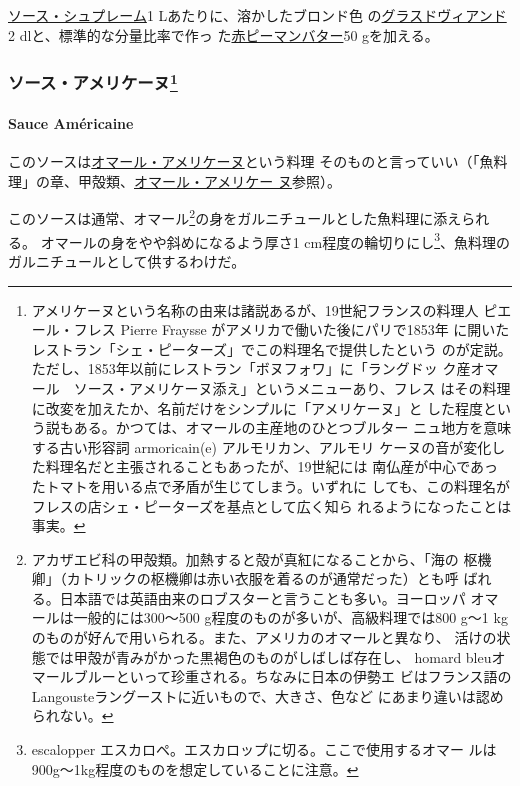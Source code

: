 \begin{recette}
\protect\hyperlink{sauce-supreme}{ソース・シュプレーム}1
Lあたりに、溶かしたブロンド色
の\protect\hyperlink{glace-de-viande}{グラスドヴィアンド}2
dlと、標準的な分量比率で作っ た\href{}{赤ピーマンバター}50 gを加える。

\maeaki

\hypertarget{ux30bdux30fcux30b9ux30a2ux30e1ux30eaux30b1ux30fcux30cc3}{%
\subsubsection[ソース・アメリケーヌ]{\texorpdfstring{ソース・アメリケーヌ\footnote{アメリケーヌという名称の由来は諸説あるが、19世紀フランスの料理人
  ピエール・フレス Pierre Fraysse がアメリカで働いた後にパリで1853年
  に開いたレストラン「シェ・ピーターズ」でこの料理名で提供したという
  のが定説。ただし、1853年以前にレストラン「ボヌフォワ」に「ラングドッ
  ク産オマール　ソース・アメリケーヌ添え」というメニューあり、フレス
  はその料理に改変を加えたか、名前だけをシンプルに「アメリケーヌ」と
  した程度という説もある。かつては、オマールの主産地のひとつブルター
  ニュ地方を意味する古い形容詞 armoricain(e) アルモリカン、アルモリ
  ケーヌの音が変化した料理名だと主張されることもあったが、19世紀には
  南仏産が中心であったトマトを用いる点で矛盾が生じてしまう。いずれに
  しても、この料理名がフレスの店シェ・ピーターズを基点として広く知ら
  れるようになったことは事実。}}{ソース・アメリケーヌ}}\label{ux30bdux30fcux30b9ux30a2ux30e1ux30eaux30b1ux30fcux30cc3}}

\hypertarget{sauce-americaine}{%
\paragraph{Sauce Américaine}\label{sauce-americaine}}


このソースは\protect\hyperlink{homard-a-l-americaine}{オマール・アメリケーヌ}という料理
そのものと言っていい（「魚料理」の章、甲殻類、\protect\hyperlink{homard-a-l-americaine}{オマール・アメリケー
ヌ}参照）。

このソースは通常、オマール\footnote{アカザエビ科の甲殻類。加熱すると殻が真紅になることから、「海の
  枢機卿」（カトリックの枢機卿は赤い衣服を着るのが通常だった）とも呼
  ばれる。日本語では英語由来のロブスターと言うことも多い。ヨーロッパ
  オマールは一般的には300〜500 g程度のものが多いが、高級料理では800 g〜1
  kgのものが好んで用いられる。また、アメリカのオマールと異なり、
  活けの状態では甲殻が青みがかった黒褐色のものがしばしば存在し、 homard
  bleuオマールブルーといって珍重される。ちなみに日本の伊勢エ
  ビはフランス語のLangousteラングーストに近いもので、大きさ、色など
  にあまり違いは認められない。}の身をガルニチュールとした魚料理に添えられる。
オマールの身をやや斜めになるよう厚さ1 cm程度の輪切りにし\footnote{escalopper
  エスカロペ。エスカロップに切る。ここで使用するオマー
  ルは900g〜1kg程度のものを想定していることに注意。}、魚料理の
ガルニチュールとして供するわけだ。


\end{recette}
